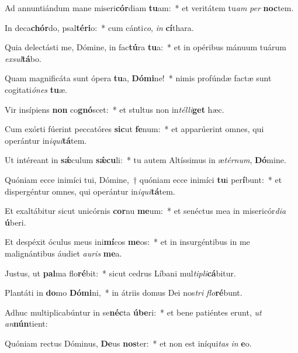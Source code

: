 \item Ad annuntiándum mane miseri\textbf{cór}diam \textbf{tu}am:~* et veritátem tu\textit{am} \textit{per} \textbf{noc}tem.
\item In deca\textbf{chór}do, psal\textbf{té}\textbf{ri}o:~* cum cánti\textit{co}, \textit{in} \textbf{cí}thara.
\item Quia delectásti me, Dómine, in fac\textbf{tú}ra \textbf{tu}a:~* et in opéribus mánuum tuárum \textit{ex}\textit{sul}\textbf{tá}bo.
\item Quam magnificáta sunt ópera \textbf{tu}a, \textbf{Dó}\textbf{mi}ne!~* nimis profúndæ factæ sunt cogitati\textit{ó}\textit{nes} \textbf{tu}æ.
\item Vir insípiens \textbf{non} co\textbf{gnó}scet:~* et stultus non in\textit{tél}\textit{li}\textbf{get} hæc.
\item Cum exórti fúerint peccatóres \textbf{sic}ut \textbf{fe}num:~* et apparúerint omnes, qui operántur in\textit{i}\textit{qui}\textbf{tá}tem.
\item Ut intéreant in \textbf{sǽ}culum \textbf{sǽ}\textbf{cu}li:~* tu autem Altíssimus in æ\textit{tér}\textit{num}, \textbf{Dó}mine.
\item Quóniam ecce inimíci tui, Dómine,~† quóniam ecce inimíci \textbf{tu}i per\textbf{í}bunt:~* et dispergéntur omnes, qui operántur in\textit{i}\textit{qui}\textbf{tá}tem.
\item Et exaltábitur sicut unicórnis \textbf{cor}nu \textbf{me}um:~* et senéctus mea in misericór\textit{di}\textit{a} \textbf{ú}beri.
\item Et despéxit óculus meus ini\textbf{mí}cos \textbf{me}os:~* et in insurgéntibus in me malignántibus áudiet \textit{au}\textit{ris} \textbf{me}a.
\item Justus, ut \textbf{pal}ma flo\textbf{ré}bit:~* sicut cedrus Líbani mul\textit{ti}\textit{pli}\textbf{cá}bitur.
\item Plantáti in \textbf{do}mo \textbf{Dó}\textbf{mi}ni,~* in átriis domus Dei nos\textit{tri} \textit{flo}\textbf{ré}bunt.
\item Adhuc multiplicabúntur in se\textbf{néc}ta \textbf{ú}\textbf{be}ri:~* et bene patiéntes erunt, \textit{ut} \textit{an}\textbf{nún}tient:
\item Quóniam rectus Dóminus, \textbf{De}us \textbf{nos}ter:~* et non est iníqui\textit{tas} \textit{in} \textbf{e}o.
